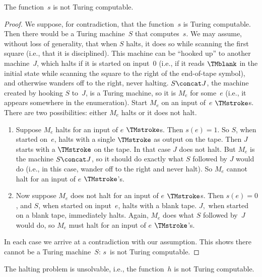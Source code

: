 \documentclass[../../../include/open-logic-section]{subfiles}
\begin{document}
\begin{lem}
The function~$s$ is not Turing computable.
\end{lem}

\begin{proof}
We suppose, for contradiction, that the function~$s$ is Turing
computable.  Then there would be a Turing machine~$S$ that
computes~$s$. We may assume, without loss of generality, that when $S$
halts, it does so while scanning the first square (i.e., that it is
disciplined).  This machine can be ``hooked up'' to another
machine~$J$, which halts if it is started on input~$0$ (i.e., if it
reads $\TMblank$ in the initial state while scanning the square to the
right of the end-of-tape symbol), and otherwise wanders off to the
right, never halting. $S \concat J$, the machine created by hooking
$S$ to~$J$, is a Turing machine, so it is $M_e$ for some~$e$ (i.e., it
appears somewhere in the enumeration). Start $M_e$ on an input of~$e$
$\TMstroke$s. There are two possibilities: either $M_e$ halts or it
does not halt.
\begin{enumerate}
\item Suppose $M_e$ halts for an input of $e$ $\TMstroke$s. Then $s(e)
  = 1$. So $S$, when started on~$e$, halts with a single $\TMstroke$
  as output on the tape.  Then $J$ starts with a $\TMstroke$ on the
  tape. In that case $J$ does not halt. But $M_e$ is the machine $S
  \concat J$, so it should do exactly what $S$ followed by $J$ would
  do (i.e., in this case, wander off to the right and never halt).  So
  $M_e$ cannot halt for an input of $e$ $\TMstroke$'s.

\item Now suppose $M_e$ does not halt for an input of $e$
  $\TMstroke$s.  Then $s(e) = 0$, and $S$, when started on input~$e$,
  halts with a blank tape.  $J$,~when started on a blank tape,
  immediately halts.  Again, $M_e$ does what $S$ followed by~$J$ would
  do, so $M_e$ must halt for an input of $e$ $\TMstroke$'s.
\end{enumerate}
In each case we arrive at a contradiction with our assumption. This
shows there cannot be a Turing machine~$S$: $s$~is not Turing
computable.
\end{proof}


\begin{thm}
 The halting problem is unsolvable, i.e.,
the function~$h$ is not Turing computable.
\end{thm}
\end{document}
